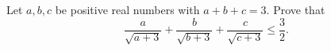Let $a,b,c$ be positive real numbers with $a+b+c=3$. Prove that
\[
\dfrac{a}{\sqrt{a+3}}+\dfrac{b}{\sqrt{b+3}}+\dfrac{c}{\sqrt{c+3}}\le\dfrac{3}{2} .
\]
